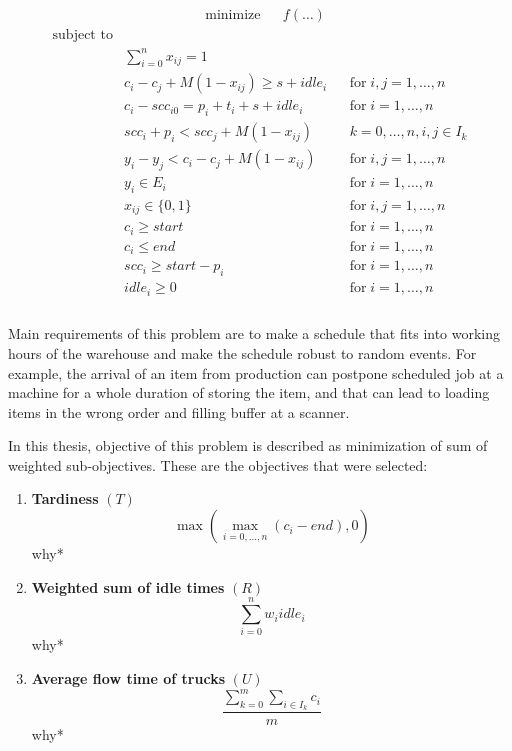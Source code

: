 \documentclass{ctuthesis}
\begin{document}
\begin{equation}
\begin{aligned}
&\text{minimize}
&&f(\ldots)
\end{aligned}
\end{equation}
\begin{equation}
\begin{aligned}
\text{subject to}\\
& \sum_{i=0}^{n} x_{ij} = 1 &&\\
& c_{i} - c_{j} + M(1 - x_{ij}) \geq s + idle_{i} && \text{for}\; i,j = 1, \ldots, n\\
& c_{i} - scc_{i0} = p_{i} + t_i + s + idle_i && \text{for}\; i = 1, \ldots, n\\
& scc_{i} + p_i < scc_j + M(1 - x_{ij}) && k = 0,\ldots,n, i,j \in I_k\\
& y_{i} - y_{j} < c_i - c_j + M(1 - x_{ij}) && \text{for}\; i,j = 1, \ldots, n\\
& y_i \in E_i && \text{for}\; i = 1, \ldots, n\\
& x_{ij} \in \{0, 1\}  && \text{for}\; i,j = 1, \ldots, n\\ 
& c_i \geq start && \text{for}\; i = 1, \ldots, n\\
& c_i \leq end && \text{for}\; i = 1, \ldots, n\\
& scc_{i} \geq start - p_i && \text{for}\; i = 1, \ldots, n\\
& idle_i \geq 0 && \text{for}\; i = 1, \ldots, n\\
\end{aligned}
\end{equation}
\\

Main requirements of this problem are to make a schedule that fits into working hours of the warehouse and make the schedule robust to random events. For example, the arrival of an item from production can postpone scheduled job at a machine for a whole duration of storing the item, and that can lead to loading items in the wrong order and filling buffer at a scanner. 

In this thesis, objective of this problem is described as minimization of sum of weighted sub-objectives. These are the objectives that were selected:
\begin{enumerate}
\item \textbf{Tardiness} $(T)$\\ \begin{equation}\max(\max_{i=0,\ldots,n}( c_i - end), 0)\end{equation}
why*
\item \textbf{Weighted sum of idle times} $(R)$\\ 
\begin{equation}
    \sum_{i=0}^{n} w_iidle_i
\end{equation}
why*
\item \textbf{Average flow time of trucks} $(U)$
\begin{equation} 
    \dfrac{\sum_{k=0}^{m} \sum_{i \in I_k} c_i}{m}
\end{equation}
why*
\end{enumerate}
\end{document}
